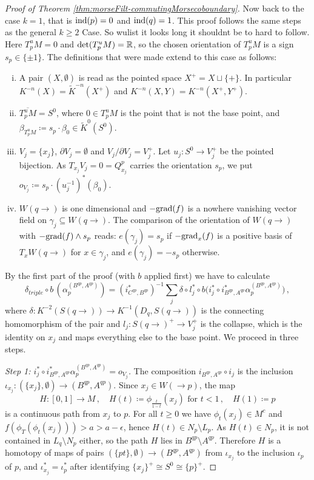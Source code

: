 \begin{proof}[Proof of Theorem \ref{thm:morseFilt-commutingMorsecoboundary}]
Now back to the case $k=1$, that is $\mathrm{ind}(p)=0$ and $\mathrm{ind}(q)=1$. This proof follows the same steps as the general $k\geq2$ Case. So wulist it looks long it shouldnt be to hard to follow. Here $T^u_pM=0$ and $\det(T^u_pM)=\mathbb{R}$, so the chosen orientation of $T^u_pM$ is a sign $s_p\in\{\pm 1\}$. The definitions that were made extend to this case as follows:
\begin{enumerate}[(i)]
	\item A pair $(X,\emptyset)$ is read as the pointed space $X^+=X\sqcup\{+\}$. In particular $K^{-n}(X)=\tilde{K}^{-n}(X^+)$ and $K^{-n}(X,Y)=K^{-n}(X^+,Y^+)$.
	\item $\overline{T^u_pM}=S^0$, where $0\in T^u_pM$ is the point that is not the base point, and $\beta_{T^u_pM}\coloneq s_p\cdot \beta_0\in \tilde{K}^0(S^0)$.
	\item $V_j=\{x_j\}$, $\partial V_j=\emptyset$ and $V_j/\partial V_j=V_j^+$. Let $u_j:S^0\to V_j^+$ be the pointed bijection. As $T_{x_j}V_j=0=Q^p_{x_j}$ carries the orientation $s_p$, we put $o_{V_j}\coloneq s_p\cdot (u_j^{-1})^*(\beta_0)$.
	\item $W(q\to)$ is one dimensional and $-\mathrm{grad}(f)$ is a nowhere vanishing vector field on $\gamma_j\subseteq W(q\to)$. The comparison of the orientation of $W(q\to)$ with $-\mathrm{grad}(f)\wedge s_p$ reads: $e(\gamma_j)=s_p$ if $-\mathrm{grad}_x(f)$ is a positive basis of $T_xW(q\to)$ for $x\in \gamma_j$, and $e(\gamma_j)=-s_p$ otherwise.
\end{enumerate}
By the first part of the proof (with $b$ applied first) we have to calculate
\begin{equation*}
	\delta_{triple}\circ b\,(\alpha_p^{(B^{qp},A^{qp})})=(i^*_{C^{qp},B^{qp}})^{-1} \sum_j \delta\circ l_j^*\circ b\big(i_j^*\circ i_{B^{qp},A^{qp}}^*\alpha_p^{(B^{qp},A^{qp})}\big)\,,
\end{equation*}
where $\delta:K^{-2}(S(q\to))\to K^{-1}(D_q,S(q\to))$ is the connecting homomorphism of the pair and $l_j:S(q\to)^+\to V_j^+$ is the collapse, which is the identity on $x_j$ and maps everything else to the base point. We proceed in three steps.
 
\emph{Step 1: $i_j^*\circ i_{B^{qp},A^{qp}}^*\alpha_p^{(B^{qp},A^{qp})}=o_{V_j}$.}
The composition $i_{B^{qp},A^{qp}}\circ i_j$ is the inclusion $\iota_{x_j}:(\{x_j\},\emptyset)\to (B^{qp},A^{qp})$. Since $x_j\in W(\to p)$, the map
\begin{equation*}
	H:[0,1]\to M\,,\quad H(t)\coloneq \phi_{\frac{t}{1-t}}(x_j) \text{ for } t<1\,,\quad H(1)\coloneq p
\end{equation*}
is a continuous path from $x_j$ to $p$. For all $t\geq 0$ we have $\phi_t(x_j)\in M^c$ and $f(\phi_{T}(\phi_t(x_j)))>a>a-\epsilon$, hence $H(t)\in N_p\setminus L_p$. As $H(t)\in N_p$, it is not contained in $L_q\setminus N_p$ either, so the path $H$ lies in $B^{qp}\setminus A^{qp}$. Therefore $H$ is a homotopy of maps of pairs $(\{pt\},\emptyset)\to(B^{qp},A^{qp})$ from $\iota_{x_j}$ to the inclusion $\iota_p$ of $p$, and $\iota_{x_j}^*=\iota_p^*$ after identifying $\{x_j\}^+\cong S^0\cong \{p\}^+$.
 

\end{proof}
